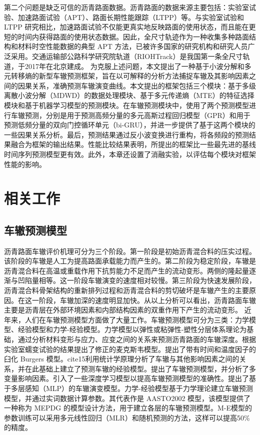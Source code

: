 第二个问题是缺乏可信的沥青路面数据。沥青路面的数据来源主要包括：实验室试验、加速路面试验（APT）、路面长期性能跟踪（LTPP）等。与实验室试验和 LTPP 研究相比，加速路面试验不仅能更真实地反映路面的使用状态，而且能在更短的时间内获得路面的使用状态数据。因此，全尺寸轨迹作为一种收集多种路面结构和材料时空性能数据的典型 APT 方法，已被许多国家的研究机构和研究人员广泛采用。交通运输部公路科学研究院轨道（RIOHTrack）是我国第一条全尺寸轨道，于2017年在北京建成\cite{9}。
为克服上述问题，本文提出了一种基于小波分解和多元转移熵的新型车辙预测框架，旨在以可解释的分析方法捕捉车辙及其影响因素之间的因果关系，准确预测车辙演变曲线。本文提出的框架包括三个模块：基于多级离散小波分解（MDWD）的数据处理模块、基于多元传递熵（MTE）的特征选择模块和基于机器学习模型的预测模块。在车辙预测模块中，使用了两个预测模型进行车辙预测，分别是用于预测高频分量的多元高斯过程回归模型（GPR）和用于预测低频分量的双向门控循环单元（bi-GRU），并进一步提供了基于这两个模块的一些因果关系分析。最后，预测结果通过反小波变换进行重构，将各频段的预测结果融合为框架的输出结果。性能比较结果表明，所提出的框架比一些最先进的基线时间序列预测模型更有效。此外，本章还设置了消融实验，以评估每个模块对框架性能的影响。

\section{相关工作}
\subsection{车辙预测模型}
沥青路面车辙评价机理可分为三个阶段\cite{10}。第一阶段是初始沥青混合料的压实过程。该阶段的车辙是人工为提高路面承载能力而产生的。第二阶段为稳定阶段，车辙是沥青混合料在高温或重载作用下抗剪能力不足而产生的流动变形。两侧的隆起量逐渐与凹陷量相等。这一阶段车辙演变的速度相对较慢。第三阶段为快速发展阶段，沥青混合料骨架结构的重新排列过程和沥青混合料的剪切破坏是车辙产生的主要原因。在这一阶段，车辙加深的速度明显加快。从以上分析可以看出，沥青路面车辙主要是沥青层在外部环境因素和内部结构因素的双重作用下产生的流动变形\cite{11,12}。
近年来，人们在车辙预测模型方面做了大量工作。车辙预测模型可分为三类：力学模型、经验模型和力学-经验模型。力学模型以弹性或粘弹性-塑性分层体系理论为基础，通过分析材料变形与应力、应变之间的关系来预测沥青路面的车辙深度。\cite{13}根据实验室蠕变试验的结果提出了修正的麦克斯韦模型。\cite{14}提出了带有时间和温度因子的臼化 Burgers 模型。cite{15}利用统计学原理分析了车辙与其他影响因素之间的关系，并在此基础上建立了预测车辙的经验模型。\cite{16}提出了车辙预测模型，并分析了多变量影响因素。引入了一些深度学习模型以提高车辙预测模型的准确性。\cite{17}提出了基于多层感知（MLP）的车辙演变模型。力学-经验模型基于力学理论建立车辙预测模型，并通过实词数据计算参数。其代表作是 AASTO2002 模型，该模型提供了一种称为 MEPDG 的模型设计方法，用于建立各层的车辙预测模型。M-E模型的参数训练可以采用多元线性回归（MLR）和随机预测的方法，这样可以提高50\%的精度\cite{19}。

